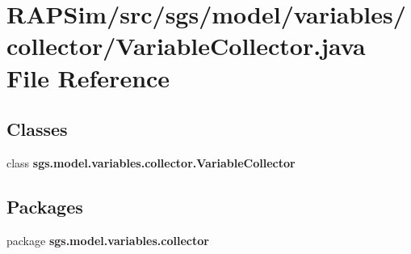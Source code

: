 \section{R\-A\-P\-Sim/src/sgs/model/variables/collector/\-Variable\-Collector.java File Reference}
\label{_variable_collector_8java}
\subsection*{Classes}
\begin{DoxyCompactItemize}
\item 
class {\bf sgs.\-model.\-variables.\-collector.\-Variable\-Collector}
\end{DoxyCompactItemize}
\subsection*{Packages}
\begin{DoxyCompactItemize}
\item 
package {\bf sgs.\-model.\-variables.\-collector}
\end{DoxyCompactItemize}
